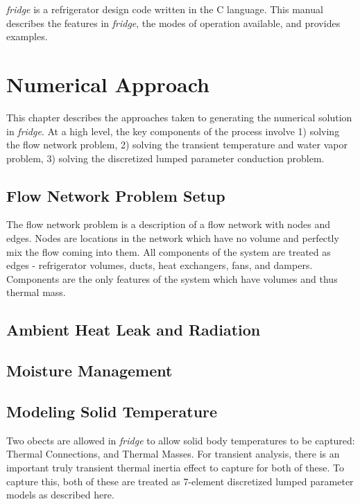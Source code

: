 \documentclass[12pt]{report}
\begin{document}
\emph{fridge} is a refrigerator design code written in the C language.  This manual 
describes the features in \emph{fridge}, the modes of operation available, and provides 
examples.


\chapter{Numerical Approach}

This chapter describes the approaches taken to generating the numerical solution in 
\emph{fridge}.  At a high level, the key components of the process involve 1) solving 
the flow network problem, 2) solving the transient temperature and water vapor problem, 
3) solving the discretized lumped parameter conduction problem.

\section{Flow Network Problem Setup}

The flow network problem is a description of a flow network with nodes and edges.  
Nodes are locations in the network which have no volume and perfectly mix the 
flow coming into them.  All components of the system are treated as edges - 
refrigerator volumes, ducts, heat exchangers, fans, and dampers.  Components are 
the only features of the system which have volumes and thus thermal mass.


\section{Ambient Heat Leak and Radiation}



\section{Moisture Management}


\section{Modeling Solid Temperature}

Two obects are allowed in \emph{fridge} to allow solid body temperatures to be 
captured:  Thermal Connections, and Thermal Masses.  For transient analysis, there 
is an important truly transient thermal inertia effect to capture for both of 
these.  To capture this, both of these are treated as 7-element discretized 
lumped parameter models as described here.
\end{document}
